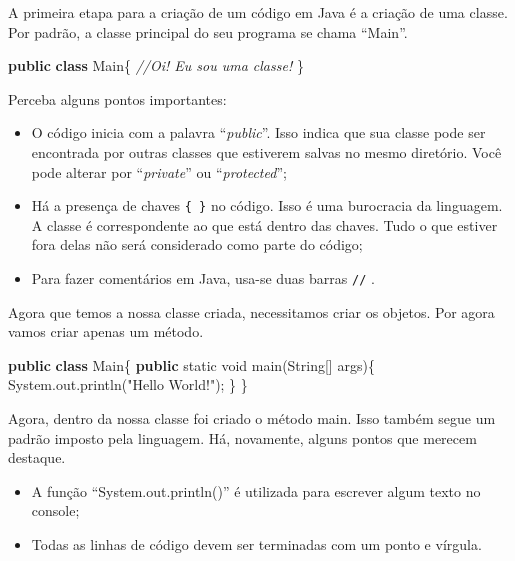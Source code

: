 \documentclass[
]{book}
\newenvironment{Shaded}{\begin{snugshade}}{\end{snugshade}}
\newcommand{\BuiltInTok}[1]{#1}
\newcommand{\CommentTok}[1]{\textcolor[rgb]{0.56,0.35,0.01}{\textit{#1}}}
\newcommand{\DataTypeTok}[1]{\textcolor[rgb]{0.13,0.29,0.53}{#1}}
\newcommand{\FunctionTok}[1]{\textcolor[rgb]{0.00,0.00,0.00}{#1}}
\newcommand{\KeywordTok}[1]{\textcolor[rgb]{0.13,0.29,0.53}{\textbf{#1}}}
\newcommand{\NormalTok}[1]{#1}
\newcommand{\StringTok}[1]{\textcolor[rgb]{0.31,0.60,0.02}{#1}}
\providecommand{\tightlist}{%
  \setlength{\itemsep}{0pt}\setlength{\parskip}{0pt}}
\begin{document}
A primeira etapa para a criação de um código em Java é a criação de uma classe. Por padrão, a classe principal do seu programa se chama ``Main''.

\begin{Shaded}
\begin{Highlighting}[]
\KeywordTok{public} \KeywordTok{class}\NormalTok{ Main\{}
  \CommentTok{//Oi! Eu sou uma classe!}
\NormalTok{\}}
\end{Highlighting}
\end{Shaded}

Perceba alguns pontos importantes:

\begin{itemize}
\tightlist
\item
  O código inicia com a palavra ``\emph{public}''. Isso indica que sua classe pode ser encontrada por outras classes que estiverem salvas no mesmo diretório. Você pode alterar por ``\emph{private}'' ou ``\emph{protected}'';
\item
  Há a presença de chaves \texttt{\{\ \}} no código. Isso é uma burocracia da linguagem. A classe é correspondente ao que está dentro das chaves. Tudo o que estiver fora delas não será considerado como parte do código;
\item
  Para fazer comentários em Java, usa-se duas barras \texttt{//} .
\end{itemize}

Agora que temos a nossa classe criada, necessitamos criar os objetos. Por agora vamos criar apenas um método.

\begin{Shaded}
\begin{Highlighting}[]
\KeywordTok{public} \KeywordTok{class}\NormalTok{ Main\{}
  \KeywordTok{public} \DataTypeTok{static} \DataTypeTok{void} \FunctionTok{main}\NormalTok{(}\BuiltInTok{String}\NormalTok{[] args)\{}
    \BuiltInTok{System}\NormalTok{.}\FunctionTok{out}\NormalTok{.}\FunctionTok{println}\NormalTok{(}\StringTok{"Hello World!"}\NormalTok{);}
\NormalTok{  \}}
\NormalTok{\}}
\end{Highlighting}
\end{Shaded}

Agora, dentro da nossa classe foi criado o método main. Isso também segue um padrão imposto pela linguagem. Há, novamente, alguns pontos que merecem destaque.

\begin{itemize}
\tightlist
\item
  A função ``System.out.println()'' é utilizada para escrever algum texto no console;
\item
  Todas as linhas de código devem ser terminadas com um ponto e vírgula.
\end{itemize}
\end{document}
